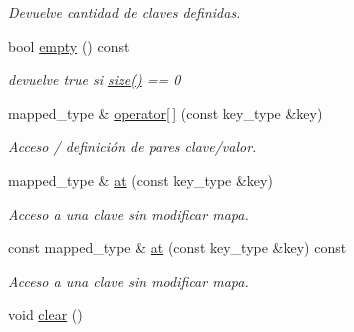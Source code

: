 \begin{DoxyCompactItemize}
\begin{DoxyCompactList}\small\item\em Devuelve cantidad de claves definidas. \end{DoxyCompactList}\item 
\hypertarget{classstring__map_a9a83f6f168f104c5d6c05c3fb989ad1f}{bool \hyperlink{classstring__map_a9a83f6f168f104c5d6c05c3fb989ad1f}{empty} () const }\label{classstring__map_a9a83f6f168f104c5d6c05c3fb989ad1f}

\begin{DoxyCompactList}\small\item\em devuelve true si \hyperlink{classstring__map_af4943b5e157f925a5085852b1e3ffac1}{size()} == 0 \end{DoxyCompactList}\item 
mapped\-\_\-type \& \hyperlink{classstring__map_a82bd8d05388e69e02a75980ef759e217}{operator\mbox{[}$\,$\mbox{]}} (const key\-\_\-type \&key)
\begin{DoxyCompactList}\small\item\em Acceso / definición de pares clave/valor. \end{DoxyCompactList}\item 
mapped\-\_\-type \& \hyperlink{classstring__map_afcc707f585755be24ffc4b06149f1cec}{at} (const key\-\_\-type \&key)
\begin{DoxyCompactList}\small\item\em Acceso a una clave sin modificar mapa. \end{DoxyCompactList}\item 
const mapped\-\_\-type \& \hyperlink{classstring__map_a26b3ded1c1736abff4580e994fab843e}{at} (const key\-\_\-type \&key) const 
\begin{DoxyCompactList}\small\item\em Acceso a una clave sin modificar mapa. \end{DoxyCompactList}\item 
\hypertarget{classstring__map_a5e0460b9c8c6f7c6e5f76e0112446842}{void \hyperlink{classstring__map_a5e0460b9c8c6f7c6e5f76e0112446842}{clear} ()}\label{classstring__map_a5e0460b9c8c6f7c6e5f76e0112446842}


\end{DoxyCompactItemize}
